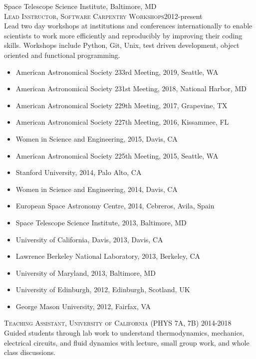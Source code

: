 \documentclass[10pt]{cv}
\begin{document}
\begin{llist}
     Space Telescope Science Institute, Baltimore, MD\\
%
\vspace{-0.1in}   
\textsc{Lead Instructor, Software Carpentry Workshops}\hfill 2012-present\\
Lead two day workshops at institutions and conferences internationally to enable scientists to work more efficiently and reproducibly by improving their coding skills. Workshops include Python, Git, Unix, test driven development, object oriented and functional programming.
\begin{itemize}
\item []American Astronomical Society 233rd Meeting, 2019, Seattle, WA 
\item []American Astronomical Society 231st Meeting, 2018, National Harbor,  MD 
\item []American Astronomical Society 229th Meeting, 2017, Grapevine, TX 
\item []American Astronomical Society 227th Meeting, 2016, Kissammee, FL 
\item []Women in Science and Engineering, 2015, Davis, CA 
\item []American Astronomical Society 225th Meeting, 2015, Seattle, WA 
\item []Stanford University, 2014, Palo Alto, CA 
\item []Women in Science and Engineering, 2014, Davis, CA 
\item []European Space Astronomy Centre, 2014, Cebreros, Avila, Spain 
\item []Space Telescope Science Institute, 2013, Baltimore, MD
\item []University of California, Davis, 2013, Davis, CA
\item []Lawrence Berkeley National Laboratory, 2013, Berkeley, CA
\item []University of Maryland, 2013, Baltimore, MD
\item []University of Edinburgh, 2012, Edinburgh, Scotland, UK
\item []George Mason University, 2012, Fairfax, VA
\end{itemize}
\textsc{Teaching Assistant, University of California} (PHYS 7A, 7B) \hfill 2014-2018\\
Guided students through lab work to understand thermodynamics, mechanics, electrical circuits, and fluid dynamics with lecture, small group work, and whole class discussions.\\

\end{llist}
\end{document}
